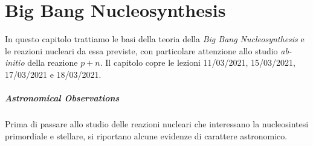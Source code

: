 \chapter{Big Bang Nucleosynthesis}\label{cap-BBN}
In questo capitolo trattiamo le basi della teoria della \textit{Big Bang Nucleosynthesis} e le reazioni nucleari da essa previste, con particolare attenzione allo studio \textit{ab-initio} della reazione $p+n$. Il capitolo copre le lezioni 11/03/2021, 15/03/2021, 17/03/2021 e 18/03/2021.

\paragraph{Astronomical Observations} Prima di passare allo studio delle reazioni nucleari che interessano la nucleosintesi primordiale e stellare, si riportano alcune evidenze di carattere astronomico.
